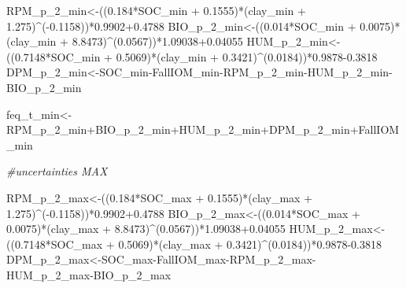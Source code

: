\documentclass[
  10pt,
  b5paper,
]{book}
\newenvironment{Shaded}{\begin{snugshade}}{\end{snugshade}}
\newcommand{\CommentTok}[1]{\textcolor[rgb]{0.56,0.35,0.01}{\textit{#1}}}
\newcommand{\FloatTok}[1]{\textcolor[rgb]{0.00,0.00,0.81}{#1}}
\newcommand{\NormalTok}[1]{#1}
\newcommand{\OtherTok}[1]{\textcolor[rgb]{0.56,0.35,0.01}{#1}}
\newcommand{\SpecialCharTok}[1]{\textcolor[rgb]{0.00,0.00,0.00}{#1}}
\begin{document}
\begin{Shaded}
\begin{Highlighting}[]
\NormalTok{RPM\_p\_2\_min}\OtherTok{\textless{}{-}}\NormalTok{((}\FloatTok{0.184}\SpecialCharTok{*}\NormalTok{SOC\_min }\SpecialCharTok{+} \FloatTok{0.1555}\NormalTok{)}\SpecialCharTok{*}\NormalTok{(clay\_min }\SpecialCharTok{+} \FloatTok{1.275}\NormalTok{)}\SpecialCharTok{\^{}}\NormalTok{(}\SpecialCharTok{{-}}\FloatTok{0.1158}\NormalTok{))}\SpecialCharTok{*}\FloatTok{0.9902+0.4788}
\NormalTok{BIO\_p\_2\_min}\OtherTok{\textless{}{-}}\NormalTok{((}\FloatTok{0.014}\SpecialCharTok{*}\NormalTok{SOC\_min }\SpecialCharTok{+} \FloatTok{0.0075}\NormalTok{)}\SpecialCharTok{*}\NormalTok{(clay\_min }\SpecialCharTok{+} \FloatTok{8.8473}\NormalTok{)}\SpecialCharTok{\^{}}\NormalTok{(}\FloatTok{0.0567}\NormalTok{))}\SpecialCharTok{*}\FloatTok{1.09038+0.04055}
\NormalTok{HUM\_p\_2\_min}\OtherTok{\textless{}{-}}\NormalTok{((}\FloatTok{0.7148}\SpecialCharTok{*}\NormalTok{SOC\_min }\SpecialCharTok{+} \FloatTok{0.5069}\NormalTok{)}\SpecialCharTok{*}\NormalTok{(clay\_min }\SpecialCharTok{+} \FloatTok{0.3421}\NormalTok{)}\SpecialCharTok{\^{}}\NormalTok{(}\FloatTok{0.0184}\NormalTok{))}\SpecialCharTok{*}\FloatTok{0.9878{-}0.3818}
\NormalTok{DPM\_p\_2\_min}\OtherTok{\textless{}{-}}\NormalTok{SOC\_min}\SpecialCharTok{{-}}\NormalTok{FallIOM\_min}\SpecialCharTok{{-}}\NormalTok{RPM\_p\_2\_min}\SpecialCharTok{{-}}\NormalTok{HUM\_p\_2\_min}\SpecialCharTok{{-}}\NormalTok{BIO\_p\_2\_min}

\NormalTok{feq\_t\_min}\OtherTok{\textless{}{-}}\NormalTok{RPM\_p\_2\_min}\SpecialCharTok{+}\NormalTok{BIO\_p\_2\_min}\SpecialCharTok{+}\NormalTok{HUM\_p\_2\_min}\SpecialCharTok{+}\NormalTok{DPM\_p\_2\_min}\SpecialCharTok{+}\NormalTok{FallIOM\_min}

\CommentTok{\#uncertainties  MAX}

\NormalTok{RPM\_p\_2\_max}\OtherTok{\textless{}{-}}\NormalTok{((}\FloatTok{0.184}\SpecialCharTok{*}\NormalTok{SOC\_max }\SpecialCharTok{+} \FloatTok{0.1555}\NormalTok{)}\SpecialCharTok{*}\NormalTok{(clay\_max }\SpecialCharTok{+} \FloatTok{1.275}\NormalTok{)}\SpecialCharTok{\^{}}\NormalTok{(}\SpecialCharTok{{-}}\FloatTok{0.1158}\NormalTok{))}\SpecialCharTok{*}\FloatTok{0.9902+0.4788}
\NormalTok{BIO\_p\_2\_max}\OtherTok{\textless{}{-}}\NormalTok{((}\FloatTok{0.014}\SpecialCharTok{*}\NormalTok{SOC\_max }\SpecialCharTok{+} \FloatTok{0.0075}\NormalTok{)}\SpecialCharTok{*}\NormalTok{(clay\_max }\SpecialCharTok{+} \FloatTok{8.8473}\NormalTok{)}\SpecialCharTok{\^{}}\NormalTok{(}\FloatTok{0.0567}\NormalTok{))}\SpecialCharTok{*}\FloatTok{1.09038+0.04055}
\NormalTok{HUM\_p\_2\_max}\OtherTok{\textless{}{-}}\NormalTok{((}\FloatTok{0.7148}\SpecialCharTok{*}\NormalTok{SOC\_max }\SpecialCharTok{+} \FloatTok{0.5069}\NormalTok{)}\SpecialCharTok{*}\NormalTok{(clay\_max }\SpecialCharTok{+} \FloatTok{0.3421}\NormalTok{)}\SpecialCharTok{\^{}}\NormalTok{(}\FloatTok{0.0184}\NormalTok{))}\SpecialCharTok{*}\FloatTok{0.9878{-}0.3818}
\NormalTok{DPM\_p\_2\_max}\OtherTok{\textless{}{-}}\NormalTok{SOC\_max}\SpecialCharTok{{-}}\NormalTok{FallIOM\_max}\SpecialCharTok{{-}}\NormalTok{RPM\_p\_2\_max}\SpecialCharTok{{-}}\NormalTok{HUM\_p\_2\_max}\SpecialCharTok{{-}}\NormalTok{BIO\_p\_2\_max}


\end{Highlighting}
\end{Shaded}
\end{document}
